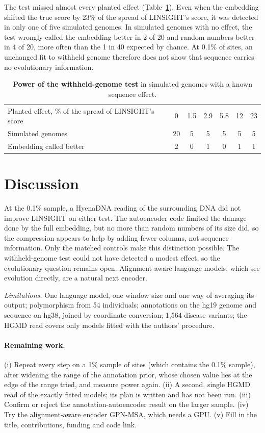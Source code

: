 \documentclass[11pt]{article}
\begin{document}
The test missed almost every planted effect (Table~\ref{tab:power}). Even when the embedding shifted
the true score by 23\% of the spread of LINSIGHT's score, it was detected in only one of five simulated
genomes. In simulated genomes with no effect, the test wrongly called the embedding better in 2 of 20
and random numbers better in 4 of 20, more often than the 1 in 40 expected by chance. At 0.1\% of
sites, an unchanged fit to withheld genome therefore does not show that sequence carries no
evolutionary information.

\begin{table}[t]
\centering\small
\caption{\textbf{Power of the withheld-genome test} in simulated genomes with a known sequence effect.}
\label{tab:power}
\begin{tabular}{@{}lcccccc@{}}
\toprule
Planted effect, \% of the spread of LINSIGHT's score & 0 & 1.5 & 2.9 & 5.8 & 12 & 23 \\
Simulated genomes & 20 & 5 & 5 & 5 & 5 & 5 \\
Embedding called better & 2 & 0 & 1 & 0 & 1 & 1 \\
\bottomrule
\end{tabular}
\end{table}

\section*{Discussion}
At the 0.1\% sample, a HyenaDNA reading of the surrounding DNA did not improve LINSIGHT on either test.
The autoencoder code limited the damage done by the full embedding, but no more than random numbers of
its size did, so the compression appears to help by adding fewer columns, not sequence information. Only
the matched controls make this distinction possible. The withheld-genome test could not have detected a
modest effect, so the evolutionary question remains open. Alignment-aware language models, which see evolution directly,
are a natural next encoder.

\emph{Limitations.} One language model, one window size and one way of averaging its output;
polymorphism from 54 individuals; annotations on the hg19 genome and sequence on
hg38, joined by coordinate conversion; 1,564 disease variants; the HGMD read covers only models fitted
with the authors' procedure.

\paragraph{Remaining work.}
(i) Repeat every step on a 1\% sample of sites (which contains the 0.1\% sample), after widening the
range of the annotation prior, whose chosen value lies at the edge of the range tried, and measure
power again. (ii) A second, single HGMD read of the exactly fitted models; its plan is written and has
not been run. (iii) Confirm or reject the annotation-autoencoder result on the larger sample. (iv) Try
the alignment-aware encoder GPN-MSA, which needs a GPU. (v) Fill in the title,
contributions, funding and code link.
\end{document}
